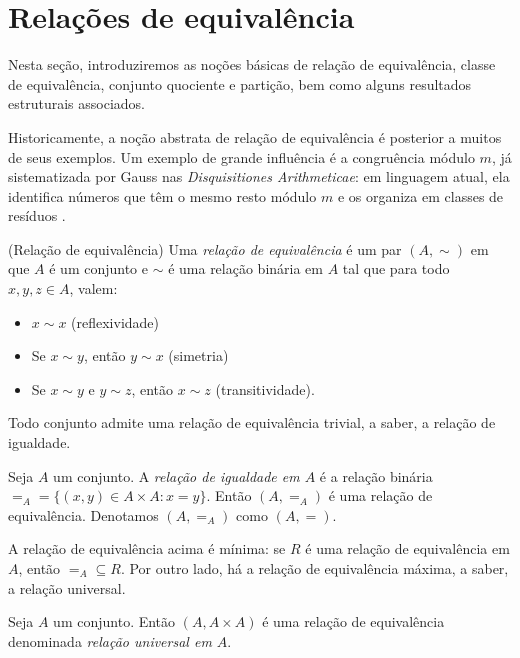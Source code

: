 \section{Relações de equivalência}\label{sec:relacoesDeEquivalencia}

Nesta seção, introduziremos as noções básicas de relação de equivalência, classe de equivalência, conjunto quociente e partição, bem como alguns resultados estruturais associados.

Historicamente, a noção abstrata de relação de equivalência é posterior a muitos de seus exemplos.
Um exemplo de grande influência é a congruência módulo $m$, já sistematizada por Gauss nas \emph{Disquisitiones Arithmeticae}: em linguagem atual, ela identifica números que têm o mesmo resto módulo $m$ e os organiza em classes de resíduos \cite{gauss1801disquisitiones}.

\begin{definition}[$\BST$](Relação de equivalência)\label{def:relacaoDeEquivalencia}
    Uma \emph{relação de equivalência} é um par $(A, \sim)$ em que $A$ é um conjunto e $\sim$ é uma relação binária em $A$ tal que para todo $x, y, z \in A$, valem:
    \begin{itemize}
        \item $x \sim x$ (reflexividade)
        \item Se $x \sim y$, então $y \sim x$ (simetria)
        \item Se $x \sim y$ e $y \sim z$, então $x \sim z$ (transitividade).
    \end{itemize}
\end{definition}

Todo conjunto admite uma relação de equivalência trivial, a saber, a relação de igualdade.

\begin{example}[$\BST$]\label{exa:relacaoDeIgualdade}
    Seja $A$ um conjunto.
    A \emph{relação de igualdade em $A$} é a relação binária $=_A=\{(x, y) \in A \times A : x=y\}$.
    Então $(A, =_A)$ é uma relação de equivalência.
    Denotamos $(A, =_A)$ como $(A, =)$.
\end{example}

A relação de equivalência acima é mínima: se $R$ é uma relação de equivalência em $A$, então $=_A \subseteq R$.
Por outro lado, há a relação de equivalência máxima, a saber, a relação universal.

\begin{example}[$\BST$]\label{exa:relacaoUniversal}
    Seja $A$ um conjunto.
    Então $(A, A \times A)$ é uma relação de equivalência denominada \emph{relação universal em $A$}.
\end{example}

